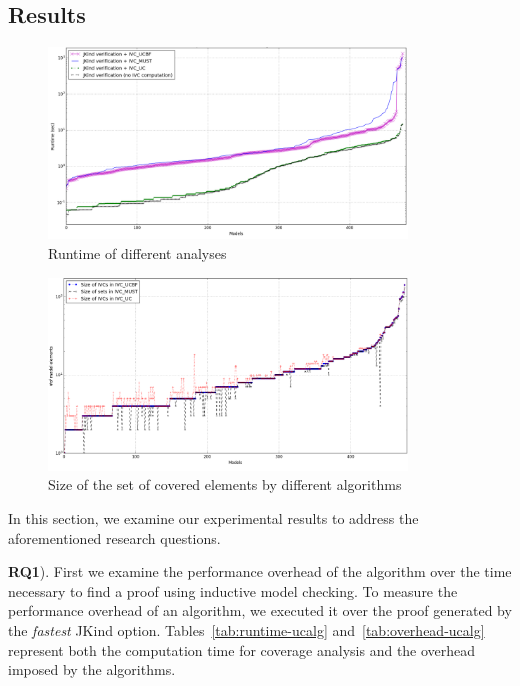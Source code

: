 \subsection{Results}
\label{sec:results}

\newcommand{\takeaway}[1]{
\vspace{6pt}
\noindent\fbox{\parbox{0.98\columnwidth}{#1}}
\vspace{6pt}
}

\begin{figure}
  \centering
  \includegraphics[width=0.85\textwidth]{figs/timing_analyses_all_sorted.png}
  \vspace{-0.1in}
  \caption{Runtime of different analyses}\label{fig:runtimeall}
\end{figure}

\begin{figure}
  \centering
  \includegraphics[width=0.85\textwidth]{figs/size.png}
  \vspace{-0.1in}
  \caption{Size of the set of covered elements by different algorithms}\label{fig:size}
\end{figure}

In this section, we examine our experimental results to address the aforementioned research questions.

\textbf{RQ1}). First we examine the performance overhead of the \ucalg algorithm over the time necessary to find a proof using inductive model checking. To measure the performance overhead of an algorithm, we executed it over the proof generated by the {\em fastest} JKind option. Tables~\ref{tab:runtime-ucalg}
and~\ref{tab:overhead-ucalg} represent both the
computation time for coverage analysis
and the overhead imposed by the algorithms.

